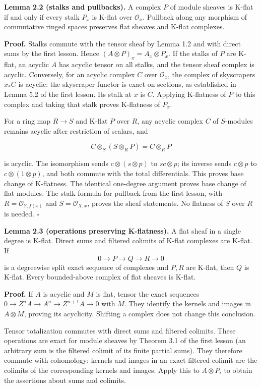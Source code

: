 \documentclass[
  english,
  11pt,
  a4paper,
]{article}
\begin{document}
\textbf{Lemma 2.2 (stalks and pullbacks).} A complex \(P\) of module
sheaves is K-flat if and only if every stalk \(P_x\) is K-flat over
\(\mathcal O_x\). Pullback along any morphism of commutative ringed
spaces preserves flat sheaves and K-flat complexes.

\textbf{Proof.} Stalks commute with the tensor sheaf by Lemma 1.2 and
with direct sums by the first lesson. Hence
\((A\otimes P)_x=A_x\otimes P_x\). If the stalks of \(P\) are K-flat, an
acyclic \(A\) has acyclic tensor on all stalks, and the tensor sheaf
complex is acyclic. Conversely, for an acyclic complex \(C\) over
\(\mathcal O_x\), the complex of skyscrapers \(x_*C\) is acyclic: the
skyscraper functor is exact on sections, as established in Lemma 5.2 of
the first lesson. Its stalk at \(x\) is \(C\). Applying K-flatness of
\(P\) to this complex and taking that stalk proves K-flatness of
\(P_x\).

For a ring map \(R\to S\) and K-flat \(P\) over \(R\), any acyclic
complex \(C\) of \(S\)-modules remains acyclic after restriction of
scalars, and

\[C\otimes_S(S\otimes_R P)=C\otimes_R P\]

is acyclic. The isomorphism sends \(c\otimes(s\otimes p)\) to
\(sc\otimes p\); its inverse sends \(c\otimes p\) to
\(c\otimes(1\otimes p)\), and both commute with the total differentials.
This proves base change of K-flatness. The identical one-degree argument
proves base change of flat modules. The stalk formula for pullback from
the first lesson, with \(R=\mathcal O_{Y,f(x)}\) and
\(S=\mathcal O_{X,x}\), proves the sheaf statements. No flatness of
\(S\) over \(R\) is needed. \(\square\)

\textbf{Lemma 2.3 (operations preserving K-flatness).} A flat sheaf in a
single degree is K-flat. Direct sums and filtered colimits of K-flat
complexes are K-flat. If
\[0\longrightarrow P\longrightarrow Q\longrightarrow R\longrightarrow0
\tag{2.3}\] is a degreewise split exact sequence of complexes and
\(P,R\) are K-flat, then \(Q\) is K-flat. Every bounded-above complex of
flat sheaves is K-flat.

\textbf{Proof.} If \(A\) is acyclic and \(M\) is flat, tensor the exact
sequences \(0\to Z^nA\to A^n\to Z^{n+1}A\to0\) with \(M\). They identify
the kernels and images in \(A\otimes M\), proving its acyclicity.
Shifting a complex does not change this conclusion.

Tensor totalization commutes with direct sums and filtered colimits.
These operations are exact for module sheaves by Theorem 3.1 of the
first lesson (an arbitrary sum is the filtered colimit of its finite
partial sums). They therefore commute with cohomology: kernels and
images in an exact filtered colimit are the colimits of the
corresponding kernels and images. Apply this to \(A\otimes P_i\) to
obtain the assertions about sums and colimits.
\end{document}
